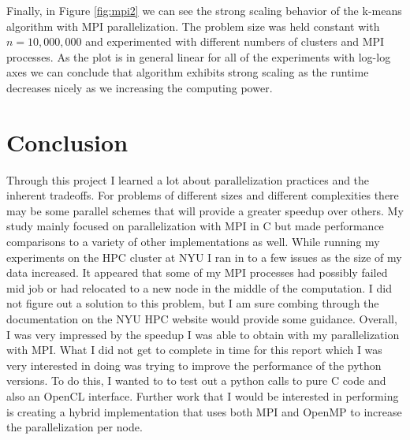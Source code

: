 \documentclass[10pt,twocolumn,letterpaper]{article}
\begin{document}
Finally, in Figure \ref{fig:mpi2} we can see the strong scaling behavior of the k-means algorithm with MPI parallelization. The problem size was held constant with $n=10,000,000$ and experimented with different numbers of clusters and MPI processes. As the plot is in general linear for all of the experiments with log-log axes we can conclude that algorithm exhibits strong scaling as the runtime decreases nicely as we increasing the computing power.

\section{Conclusion}
Through this project I learned a lot about parallelization practices and the inherent tradeoffs. For problems of different sizes and different complexities there may be some parallel schemes that will provide a greater speedup over others. My study mainly focused on parallelization with MPI in C but made performance comparisons to a variety of other implementations as well. While running my experiments on the HPC cluster at NYU I ran in to a few issues as the size of my data increased. It appeared that some of my MPI processes had possibly failed mid job or had relocated to a new node in the middle of the computation. I did not figure out a solution to this problem, but I am sure combing through the documentation on the NYU HPC website would provide some guidance. Overall, I was very impressed by the speedup I was able to obtain with my parallelization with MPI. What I did not get to complete in time for this report which I was very interested in doing was trying to improve the performance of the python versions. To do this, I wanted to to test out a python calls to pure C code and also an OpenCL interface. Further work that I would be interested in performing is creating a hybrid implementation that uses both MPI and OpenMP to increase the parallelization per node. 
\end{document}
